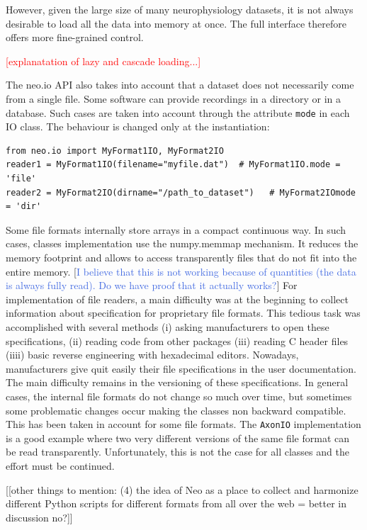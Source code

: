 \documentclass{frontiers}
\newcommand{\missing}[1]{\textcolor{red}{#1}}
\newcommand{\samuel}[1]{[\textcolor{RubineRed}{#1}]}
\newcommand{\robert}[1]{[\textcolor{RoyalBlue}{#1}]}
\begin{document}
However, given the large size of many neurophysiology datasets, it is not always desirable to load all the data into memory at once. The full interface therefore offers more fine-grained control.

\missing{[explanatation of lazy and cascade loading...]}


The neo.io API also takes into account that a dataset does not necessarily come from a single file. Some software can provide recordings in a directory or in a database. Such cases are taken into account through the attribute \lstinline`mode` in each IO class. The behaviour is changed only at the instantiation:

\begin{lstlisting}[style=display]
from neo.io import MyFormat1IO, MyFormat2IO
reader1 = MyFormat1IO(filename="myfile.dat")  # MyFormat1IO.mode = 'file'
reader2 = MyFormat2IO(dirname="/path_to_dataset")   # MyFormat2IOmode = 'dir'
\end{lstlisting}

Some file formats internally store arrays in a compact continuous way. In such cases, classes implementation use the numpy.memmap mechanism. It reduces the memory footprint and allows to access transparently files that do not fit into the entire memory. \robert{I believe that this is not working because of quantities (the data is always fully read). Do we have proof that it actually works?}
For implementation of file readers, a main difficulty was at the beginning to collect information about specification for proprietary file formats. This tedious task was accomplished with several methods (i) asking manufacturers to open these specifications, (ii) reading code from other packages (iii) reading C header files (iiii) basic reverse engineering with hexadecimal editors. Nowadays, manufacturers give quit easily their file specifications in the user documentation.
The main difficulty remains in the versioning of these specifications. In general cases, the internal file formats do not change so much over time, but sometimes some problematic changes occur making the classes non backward compatible. This has been taken in account for some file formats. The \lstinline`AxonIO` implementation is a good example where two very different versions of the same file format can be read transparently. Unfortunately, this is not the case for all classes and the effort must be continued.

\samuel{[other things to mention: (4) the idea of Neo as a place to collect and harmonize different Python scripts for different formats from all over the web = better in discussion no?]}
\end{document}
